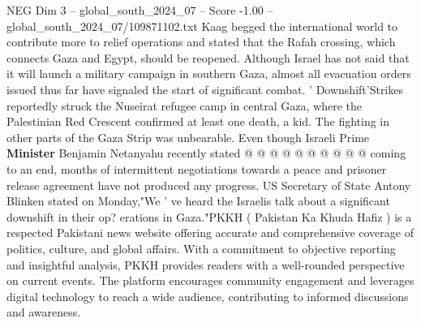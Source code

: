 \begin{textsample}{NEG Dim 3 – global\_south\_2024\_07 – Score -1.00 – global\_south\_2024\_07/109871102.txt}
Kaag begged the international world to contribute more to relief operations and stated that the Rafah crossing, which connects Gaza and Egypt, should be reopened.
Although Israel has not said that it will launch a military campaign in southern Gaza, almost all evacuation orders issued thus far have signaled the start of significant combat. ' Downshift'Strikes reportedly struck the Nuseirat refugee camp in central Gaza, where the Palestinian Red Crescent confirmed at least one death, a kid.
The fighting in other parts of the Gaza Strip was unbearable.
Even though Israeli Prime \textbf{Minister} Benjamin Netanyahu recently stated @ @ @ @ @ @ @ @ @ @ coming to an end, months of intermittent negotiations towards a peace and prisoner release agreement have not produced any progress.
US Secretary of State Antony Blinken stated on Monday,"We ' ve heard the Israelis talk about a significant downshift in their op? erations in Gaza."PKKH ( Pakistan Ka Khuda Hafiz ) is a respected Pakistani news website offering accurate and comprehensive coverage of politics, culture, and global affairs.
With a commitment to objective reporting and insightful analysis, PKKH provides readers with a well-rounded perspective on current events.
The platform encourages community engagement and leverages digital technology to reach a wide audience, contributing to informed discussions and awareness.

\end{textsample}
